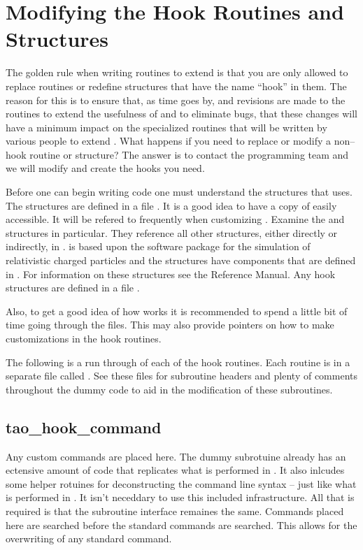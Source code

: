 \section{Modifying the Hook Routines and Structures}

The golden rule when writing routines to extend \tao is that you are
only allowed to replace routines or redefine structures that have the
name ``hook'' in them. The reason for this is to ensure that, as time
goes by, and revisions are made to the \tao routines to extend the
usefulness of \tao and to eliminate bugs, that these changes will
have a minimum impact on the specialized routines that will be written
by various people to extend \tao.  What happens if you need to replace
or modify a non--hook routine or structure?  The answer is to contact
the \tao programming team and we will modify \tao and create the hooks 
you need.

Before one can begin writing code one must understand the structures
that \tao uses. The structures are defined in a file
. It is a good idea to have a copy of
 easily accessible. It will be refered to frequently
when customizing \tao. Examine the  and
 structures in particular. They reference all other
structures, either directly or indirectly, in . 
\tao is based upon the \bmad software
package for the simulation of relativistic charged particles and the
\tao structures have components that are defined in \bmad. For
information on these structures see the \bmad Reference Manual. Any hook 
structures are defined in a file .

Also, to get a good idea of how \tao works it is recommended to spend a
little bit of time going through the  files. This may also
provide pointers on how to make customizations in the hook routines.

The following is a run through of each of the hook routines. Each routine
is in a separate file called . See these
files for subroutine headers and plenty of comments throughout the dummy code to aid
in the modification of these subroutines.

\subsection{tao\_hook\_command}

Any custom commands are placed here. The dummy subrotuine already has an
ectensive amount of code that replicates what is performed in
. It also inlcudes some helper rotuines for deconstructing the
command line syntax -- just like what is performed in . It isn't
neceddary to use this included infrastructure. All that is required is that the
subroutine interface remaines the same. Commands placed here are searched before
the standard \tao commands are searched. This allows for the overwriting of any
standard \tao command.

